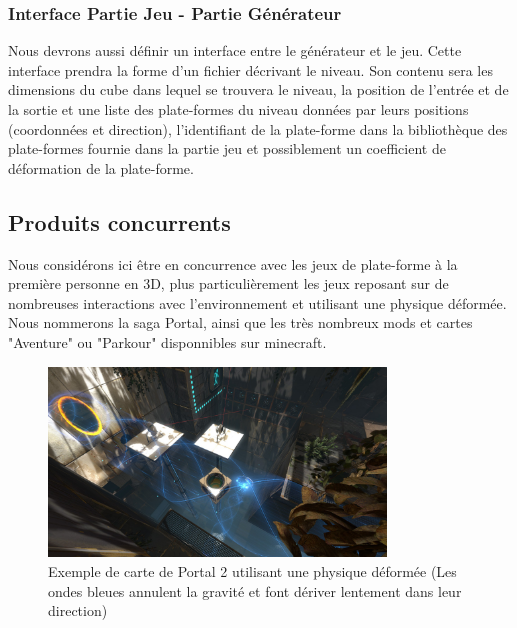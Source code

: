 \documentclass[12pt]{article}
\begin{document}
        \subsubsection{Interface Partie Jeu - Partie Générateur}
            Nous devrons aussi définir un interface entre le générateur et le jeu. Cette interface prendra la forme d'un fichier décrivant le niveau. Son contenu sera les dimensions du cube dans lequel se trouvera le niveau, la position de l'entrée et de la sortie et une liste des plate-formes du niveau données par leurs positions (coordonnées et direction), l'identifiant de la plate-forme dans la bibliothèque des plate-formes fournie dans la partie jeu et possiblement un coefficient de déformation de la plate-forme.
        
    \subsection{Produits concurrents}
        Nous considérons ici être en concurrence avec les jeux de plate-forme à la première personne en 3D, plus particulièrement les jeux reposant sur de nombreuses interactions avec l'environnement et utilisant une physique déformée. Nous nommerons la saga Portal, ainsi que les très nombreux mods et cartes "Aventure" ou "Parkour" disponnibles sur minecraft.
        
        \begin{figure}[h]
        \begin{center}
            \includegraphics[width=0.8\textwidth]{portal2.jpg}
                \caption{Exemple de carte de Portal 2 utilisant une physique déformée (Les ondes bleues annulent la gravité et font dériver lentement dans leur direction)}
        \end{center}
        \end{figure}
        
\end{document}
